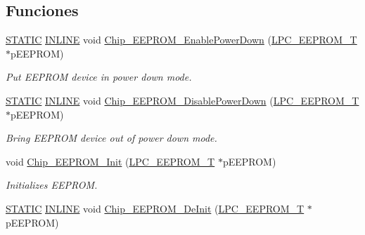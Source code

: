 \subsection*{Funciones}
\begin{DoxyCompactItemize}
\item 
\hyperlink{group___l_p_c___types___public___macros_ga10b2d890d871e1489bb02b7e70d9bdfb}{S\+T\+A\+T\+IC} \hyperlink{spifi__18xx__43xx_8h_a2eb6f9e0395b47b8d5e3eeae4fe0c116}{I\+N\+L\+I\+NE} void \hyperlink{group___e_e_p_r_o_m__18_x_x__43_x_x_gacce700347262d143041848308f8f3f6f}{Chip\+\_\+\+E\+E\+P\+R\+O\+M\+\_\+\+Enable\+Power\+Down} (\hyperlink{struct_l_p_c___e_e_p_r_o_m___t}{L\+P\+C\+\_\+\+E\+E\+P\+R\+O\+M\+\_\+T} $\ast$p\+E\+E\+P\+R\+OM)
\begin{DoxyCompactList}\small\item\em Put E\+E\+P\+R\+OM device in power down mode. \end{DoxyCompactList}\item 
\hyperlink{group___l_p_c___types___public___macros_ga10b2d890d871e1489bb02b7e70d9bdfb}{S\+T\+A\+T\+IC} \hyperlink{spifi__18xx__43xx_8h_a2eb6f9e0395b47b8d5e3eeae4fe0c116}{I\+N\+L\+I\+NE} void \hyperlink{group___e_e_p_r_o_m__18_x_x__43_x_x_ga6cf4052474abe94b3c47ce09b67bb03f}{Chip\+\_\+\+E\+E\+P\+R\+O\+M\+\_\+\+Disable\+Power\+Down} (\hyperlink{struct_l_p_c___e_e_p_r_o_m___t}{L\+P\+C\+\_\+\+E\+E\+P\+R\+O\+M\+\_\+T} $\ast$p\+E\+E\+P\+R\+OM)
\begin{DoxyCompactList}\small\item\em Bring E\+E\+P\+R\+OM device out of power down mode. \end{DoxyCompactList}\item 
void \hyperlink{group___e_e_p_r_o_m__18_x_x__43_x_x_ga6f3f3f16f0e24eaa45bbfd7089ed43bb}{Chip\+\_\+\+E\+E\+P\+R\+O\+M\+\_\+\+Init} (\hyperlink{struct_l_p_c___e_e_p_r_o_m___t}{L\+P\+C\+\_\+\+E\+E\+P\+R\+O\+M\+\_\+T} $\ast$p\+E\+E\+P\+R\+OM)
\begin{DoxyCompactList}\small\item\em Initializes E\+E\+P\+R\+OM. \end{DoxyCompactList}\item 
\hyperlink{group___l_p_c___types___public___macros_ga10b2d890d871e1489bb02b7e70d9bdfb}{S\+T\+A\+T\+IC} \hyperlink{spifi__18xx__43xx_8h_a2eb6f9e0395b47b8d5e3eeae4fe0c116}{I\+N\+L\+I\+NE} void \hyperlink{group___e_e_p_r_o_m__18_x_x__43_x_x_ga8b179a01d2c806ab4797712c3fc47098}{Chip\+\_\+\+E\+E\+P\+R\+O\+M\+\_\+\+De\+Init} (\hyperlink{struct_l_p_c___e_e_p_r_o_m___t}{L\+P\+C\+\_\+\+E\+E\+P\+R\+O\+M\+\_\+T} $\ast$p\+E\+E\+P\+R\+OM)

\end{DoxyCompactItemize}
